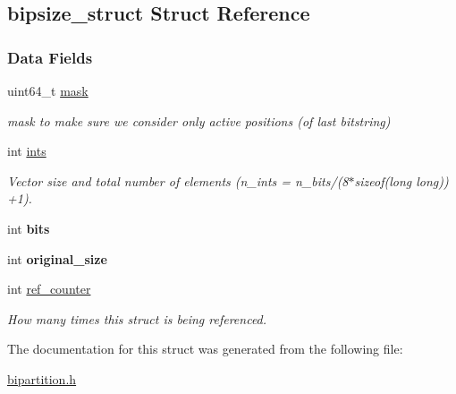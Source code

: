 \hypertarget{structbipsize__struct}{}\subsection{bipsize\+\_\+struct Struct Reference}
\label{structbipsize__struct}
\subsubsection*{Data Fields}
\begin{DoxyCompactItemize}
\item 
\mbox{\label{structbipsize__struct_aaa074f83194be279e68e0d75ed600661}} 
uint64\+\_\+t \hyperlink{structbipsize__struct_aaa074f83194be279e68e0d75ed600661}{mask}
\begin{DoxyCompactList}\small\item\em mask to make sure we consider only active positions (of last bitstring) \end{DoxyCompactList}\item 
\mbox{\label{structbipsize__struct_a6e10e8346b588d6f067390563555c715}} 
int \hyperlink{structbipsize__struct_a6e10e8346b588d6f067390563555c715}{ints}
\begin{DoxyCompactList}\small\item\em Vector size and total number of elements (n\+\_\+ints = n\+\_\+bits/(8$\ast$sizeof(long long)) +1). \end{DoxyCompactList}\item 
\mbox{\label{structbipsize__struct_a50fe37bd6c5a60d0b116f00fe7c7d682}} 
int {\bfseries bits}
\item 
\mbox{\label{structbipsize__struct_a54bd9f5a6dcdfa63a894c85c190c2cdb}} 
int {\bfseries original\+\_\+size}
\item 
\mbox{\label{structbipsize__struct_aa9910466ce6084db517ab205898e25a6}} 
int \hyperlink{structbipsize__struct_aa9910466ce6084db517ab205898e25a6}{ref\+\_\+counter}
\begin{DoxyCompactList}\small\item\em How many times this struct is being referenced. \end{DoxyCompactList}\end{DoxyCompactItemize}


The documentation for this struct was generated from the following file\+:\begin{DoxyCompactItemize}
\item 
\hyperlink{bipartition_8h}{bipartition.\+h}\end{DoxyCompactItemize}

